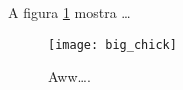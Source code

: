 \documentclass{article}
\begin{document}
A figura \ref{fig:chick} mostra \ldots

\begin{figure}
\centering
\texttt{[image: big\_chick]}
\caption{\label{fig:chick}Aww\ldots.}
\end{figure}
\end{document}
